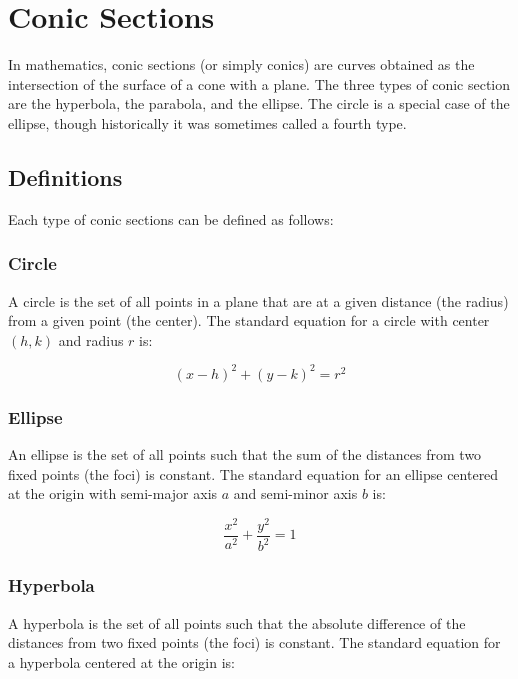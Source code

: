 \chapter{Conic Sections}

In mathematics, conic sections (or simply conics) are curves obtained
as the intersection of the surface of a cone with a plane. The three
types of conic section are the hyperbola, the parabola, and the
ellipse. The circle is a special case of the ellipse, though
historically it was sometimes called a fourth type.

\section{Definitions}

Each type of conic sections can be defined as follows:

\subsection{Circle}

A circle is the set of all points in a plane that are at a given
distance (the radius) from a given point (the center). The standard
equation for a circle with center $(h,k)$ and radius $r$ is:

\begin{equation}
(x - h)^2 + (y - k)^2 = r^2
\end{equation}

\subsection{Ellipse}

An ellipse is the set of all points such that the sum of the distances
from two fixed points (the foci) is constant. The standard equation
for an ellipse centered at the origin with semi-major axis $a$ and
semi-minor axis $b$ is:

\begin{equation}
\frac{x^2}{a^2} + \frac{y^2}{b^2} = 1
\end{equation}

\subsection{Hyperbola}

A hyperbola is the set of all points such that the absolute difference
of the distances from two fixed points (the foci) is constant. The
standard equation for a hyperbola centered at the origin is:

